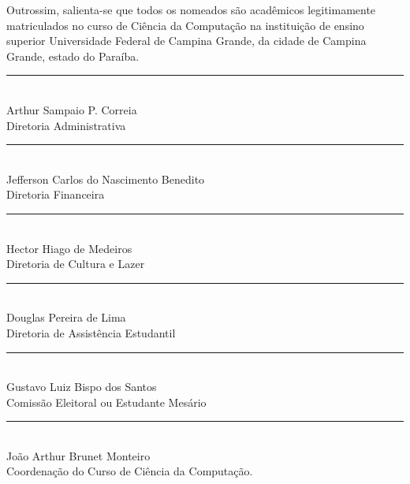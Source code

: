 \documentclass[11pt,letterpaper]{article}
\begin{document}
Outrossim, salienta-se que todos os nomeados são acadêmicos legitimamente matriculados no curso de Ciência da Computação na instituição de ensino superior Universidade Federal de Campina Grande, da cidade de Campina Grande, estado do Paraíba. \\

\begin{multicols}{2}
  \begin{center}
  \rule[]{3in}{0.1pt} \\
  Arthur Sampaio P. Correia\\ Diretoria Administrativa\\
  \end{center}

  \begin{center}
  \rule[]{3in}{0.1pt} \\
  Jefferson Carlos do Nascimento Benedito\\ Diretoria Financeira\\
  \end{center}

  \begin{center}
  \rule[]{3in}{0.1pt} \\
  Hector Hiago de Medeiros\\ Diretoria de Cultura e Lazer\\
  \end{center}

  \begin{center}
  \rule[]{3in}{0.1pt} \\
  Douglas Pereira de Lima\\ Diretoria de Assistência Estudantil\\
  \end{center}

\end{multicols}









\begin{center}
  \rule[]{3in}{0.1pt} \\
  Gustavo Luiz Bispo dos Santos\\ Comissão Eleitoral ou Estudante Mesário\\
\end{center}

\begin{center}
\rule[]{3in}{0.1pt} \\
João Arthur Brunet Monteiro\\ Coordenação do Curso de Ciência da Computação.\\
\end{center}
\end{document}
